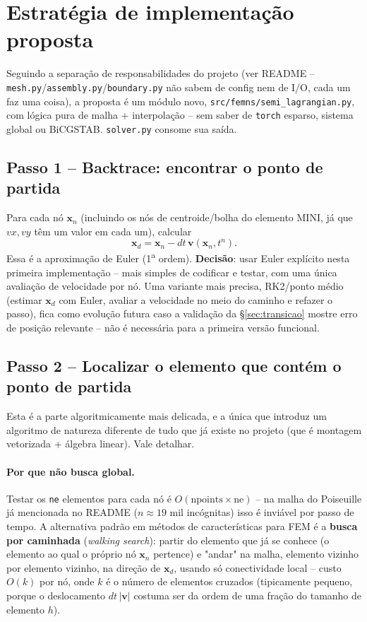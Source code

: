\documentclass[11pt,a4paper]{article}
\begin{document}
\section{Estratégia de implementação proposta}
\label{sec:estrategia}

Seguindo a separação de responsabilidades do projeto (ver README --
\texttt{mesh.py}/\texttt{assembly.py}/\texttt{boundary.py} não sabem
de config nem de I/O, cada um faz uma coisa), a proposta é um módulo
novo, \texttt{src/femns/semi\_lagrangian.py}, com lógica pura de
malha + interpolação -- sem saber de \texttt{torch} esparso, sistema
global ou BiCGSTAB. \texttt{solver.py} consome sua saída.

\subsection{Passo 1 -- Backtrace: encontrar o ponto de partida}

Para cada nó $\mathbf{x}_n$ (incluindo os nós de centroide/bolha do
elemento MINI, já que $vx, vy$ têm um valor em cada um), calcular
\[
\mathbf{x}_d = \mathbf{x}_n - dt\,\mathbf{v}(\mathbf{x}_n, t^n).
\]
Essa é a aproximação de Euler (1\textsuperscript{a} ordem).
\textbf{Decisão}: usar Euler explícito nesta primeira implementação
-- mais simples de codificar e testar, com uma única avaliação de
velocidade por nó. Uma variante mais precisa, RK2/ponto médio
(estimar $\mathbf{x}_d$ com Euler, avaliar a velocidade no meio do
caminho e refazer o passo), fica como evolução futura caso a
validação da \S\ref{sec:transicao} mostre erro de posição relevante
-- não é necessária para a primeira versão funcional.

\subsection{Passo 2 -- Localizar o elemento que contém o ponto de partida}

Esta é a parte algoritmicamente mais delicada, e a única que
introduz um algoritmo de natureza diferente de tudo que já existe no
projeto (que é montagem vetorizada + álgebra linear). Vale detalhar.

\paragraph{Por que não busca global.} Testar os \texttt{ne} elementos
para cada nó é $O(\text{npoints} \times \text{ne})$ -- na malha do
Poiseuille já mencionada no README ($n\approx 19$ mil incógnitas)
isso é inviável por passo de tempo. A alternativa padrão em métodos
de características para FEM é a \textbf{busca por caminhada}
(\emph{walking search}): partir do elemento que já se conhece (o
elemento ao qual o próprio nó $\mathbf{x}_n$ pertence) e "andar" na
malha, elemento vizinho por elemento vizinho, na direção de
$\mathbf{x}_d$, usando só conectividade local -- custo $O(k)$ por nó,
onde $k$ é o número de elementos cruzados (tipicamente pequeno,
porque o deslocamento $dt\,|\mathbf{v}|$ costuma ser da ordem de uma
fração do tamanho de elemento $h$).
\end{document}
